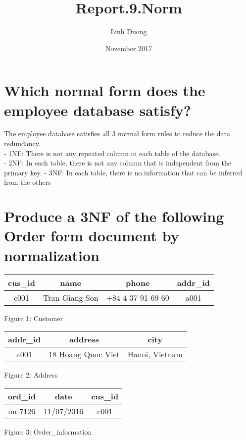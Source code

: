 \documentclass{article}
\title{Report.9.Norm}
\author{Linh Duong}
\date{November 2017}
\begin{document}
\maketitle

\section{Which normal form does the employee database satisfy?}
The employee database satisfies all 3 normal form rules to reduce the data redundancy.\\
- 1NF: There is not any repeated column in each table of the database. \\
- 2NF: In each table, there is not any column that is independent from the primary key.
- 3NF: In each table, there is no information that can be inferred from the others

\section{Produce a 3NF of the following Order form document by normalization}
\begin{center}
    \begin{tabular}{|c|c|c|c|}
    \hline
    \centering  cus\_id & name & phone & addr\_id \\
    \hline
    c001 & Tran Giang Son & +84-4 37 91 69 60 & a001 \\
    \hline
    \end{tabular}
    \bigskip 
    \newline Figure 1: Customer 
\end{center}

\bigskip 
\bigskip 
\bigskip 

\begin{center}
    \begin{tabular}{|c|c|c|}
    \hline
    \centering  addr\_id & address & city \\
    \hline
    a001 & 18 Hoang Quoc Viet & Hanoi, Vietnam \\
    \hline
    \end{tabular}
    \bigskip 
    \newline Figure 2: Address
\end{center}

\bigskip 
\bigskip 
\bigskip 

\begin{center}
    \begin{tabular}{|c|c|c|}
    \hline
    \centering  ord\_id & date & cus\_id \\
    \hline
    on 7126 & 11/07/2016 & c001 \\
    \hline
    \end{tabular}
    \bigskip 
    \newline Figure 3: Order\_information
\end{center}
\end{document}
